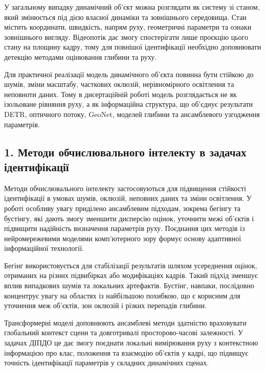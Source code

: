 \documentclass[
]{article}
\begin{document}
У загальному випадку динамічний об'єкт можна розглядати як систему зі станом, який змінюється під дією власної динаміки та зовнішнього середовища. Стан містить координати, швидкість, напрям руху, геометричні параметри та ознаки зовнішнього вигляду. Відеопотік дає змогу спостерігати лише проєкцію цього стану на площину кадру, тому для повнішої ідентифікації необхідно доповнювати детекцію методами оцінювання глибини та руху.

Для практичної реалізації модель динамічного об'єкта повинна бути стійкою до шумів, зміни масштабу, часткових оклюзій, нерівномірного освітлення та неповноти даних. Тому в дисертаційній роботі модель розглядається не як ізольоване рівняння руху, а як інформаційна структура, що об'єднує результати DETR, оптичного потоку, GeoNet, моделей глибини та ансамблевого узгодження параметрів.

\subsection{1. Методи обчислювального інтелекту в задачах ідентифікації}\label{ux43cux435ux442ux43eux434ux438-ux43eux431ux447ux438ux441ux43bux44eux432ux430ux43bux44cux43dux43eux433ux43e-ux456ux43dux442ux435ux43bux435ux43aux442ux443-ux432-ux437ux430ux434ux430ux447ux430ux445-ux456ux434ux435ux43dux442ux438ux444ux456ux43aux430ux446ux456ux457}

Методи обчислювального інтелекту застосовуються для підвищення стійкості ідентифікації в умовах шумів, оклюзій, неповних даних та зміни освітлення. У роботі особливу увагу приділено ансамблевим підходам, зокрема бегінгу та бустінгу, які дають змогу зменшити дисперсію оцінок, уточнити межі об'єктів і підвищити надійність визначення параметрів руху. Поєднання цих методів із нейромережевими моделями комп'ютерного зору формує основу адаптивної інформаційної технології.

Бегінг використовується для стабілізації результатів шляхом усереднення оцінок, отриманих на різних підвибірках або модифікаціях кадрів. Такий підхід зменшує вплив випадкових шумів та локальних артефактів. Бустінг, навпаки, послідовно концентрує увагу на областях із найбільшою похибкою, що є корисним для уточнення меж об'єктів, зон оклюзій і різких перепадів глибини.

Трансформерні моделі доповнюють ансамблеві методи здатністю враховувати глобальний контекст сцени та довготривалі просторово-часові залежності. У задачах ДІПДО це дає змогу поєднати локальні вимірювання руху з контекстною інформацією про клас, положення та взаємодію об'єктів у кадрі, що підвищує точність ідентифікації параметрів у складних динамічних сценах.
\end{document}
